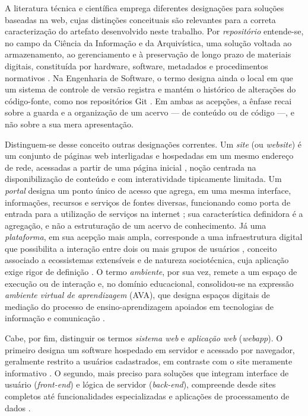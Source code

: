 A literatura técnica e científica emprega diferentes designações para soluções baseadas na web, cujas distinções conceituais são relevantes para a correta caracterização do artefato desenvolvido neste trabalho. Por \textit{repositório} entende-se, no campo da Ciência da Informação e da Arquivística, uma solução voltada ao armazenamento, ao gerenciamento e à preservação de longo prazo de materiais digitais, constituída por hardware, software, metadados e procedimentos normativos \cite{conarq2015}. Na Engenharia de Software, o termo designa ainda o local em que um sistema de controle de versão registra e mantém o histórico de alterações do código-fonte, como nos repositórios Git \cite{chacon2014}. Em ambas as acepções, a ênfase recai sobre a guarda e a organização de um acervo --- de conteúdo ou de código ---, e não sobre a sua mera apresentação.

Distinguem-se desse conceito outras designações correntes. Um \textit{site} (ou \textit{website}) é um conjunto de páginas web interligadas e hospedadas em um mesmo endereço de rede, acessadas a partir de uma página inicial \cite{w3c1999}, noção centrada na disponibilização de conteúdo e com interatividade tipicamente limitada. Um \textit{portal} designa um ponto único de acesso que agrega, em uma mesma interface, informações, recursos e serviços de fontes diversas, funcionando como porta de entrada para a utilização de serviços na internet \cite{gouveia2007}; sua característica definidora é a agregação, e não a estruturação de um acervo de conhecimento. Já uma \textit{plataforma}, em sua acepção mais ampla, corresponde a uma infraestrutura digital que possibilita a interação entre dois ou mais grupos de usuários \cite{srnicek2017}, conceito associado a ecossistemas extensíveis e de natureza sociotécnica, cuja aplicação exige rigor de definição \cite{dereuver2018}. O termo \textit{ambiente}, por sua vez, remete a um espaço de execução ou de interação e, no domínio educacional, consolidou-se na expressão \textit{ambiente virtual de aprendizagem} (AVA), que designa espaços digitais de mediação do processo de ensino-aprendizagem apoiados em tecnologias de informação e comunicação \cite{almeida2003}.

Cabe, por fim, distinguir os termos \textit{sistema web} e \textit{aplicação web} (\textit{webapp}). O primeiro designa um software hospedado em servidor e acessado por navegador, geralmente restrito a usuários cadastrados, em contraste com o site meramente informativo \cite{sommerville2011}. O segundo, mais preciso para soluções que integram interface de usuário (\textit{front-end}) e lógica de servidor (\textit{back-end}), compreende desde sites completos até funcionalidades especializadas e aplicações de processamento de dados \cite{pressman2011}.

